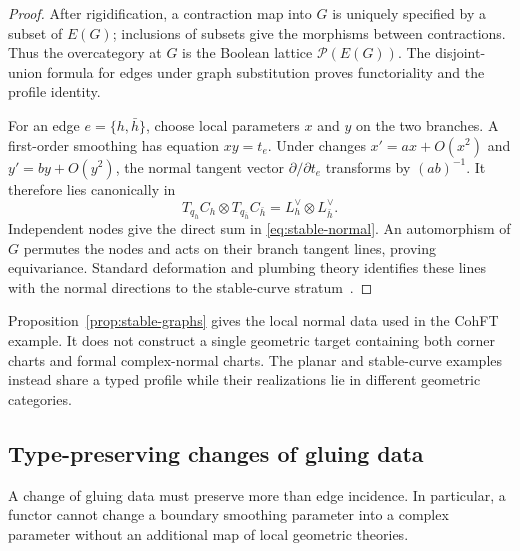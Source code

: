 \documentclass[11pt,letterpaper,twoside]{article}
\theoremstyle{plain}
\theoremstyle{definition}
\theoremstyle{remark}
\let\cite\citep
\begin{document}
\begin{proof}
After rigidification, a contraction map into \(G\) is uniquely specified by a subset of \(E(G)\); inclusions of subsets give the morphisms between contractions.  Thus the overcategory at \(G\) is the Boolean lattice \(\mathcal P(E(G))\).  The disjoint-union formula for edges under graph substitution proves functoriality and the profile identity.

For an edge \(e=\{h,\bar h\}\), choose local parameters \(x\) and \(y\) on the two branches.  A first-order smoothing has equation \(xy=t_e\).  Under changes \(x'=ax+O(x^2)\) and \(y'=by+O(y^2)\), the normal tangent vector \(\partial/\partial t_e\) transforms by \((ab)^{-1}\).  It therefore lies canonically in
\[
 T_{q_h}C_h\otimes T_{q_{\bar h}}C_{\bar h}
 =L_h^\vee\otimes L_{\bar h}^\vee.
\]
Independent nodes give the direct sum in \eqref{eq:stable-normal}.  An automorphism of \(G\) permutes the nodes and acts on their branch tangent lines, proving equivariance.  Standard deformation and plumbing theory identifies these lines with the normal directions to the stable-curve stratum~\cite{acg2011,wolpert2013}.
\end{proof}

Proposition~\ref{prop:stable-graphs} gives the local normal data used in the CohFT example.  It does not construct a single geometric target containing both corner charts and formal complex-normal charts.  The planar and stable-curve examples instead share a typed profile while their realizations lie in different geometric categories.

\subsection{Type-preserving changes of gluing data}\label{sec:change-grammar}

A change of gluing data must preserve more than edge incidence.  In particular, a functor cannot change a boundary smoothing parameter into a complex parameter without an additional map of local geometric theories.
\end{document}
